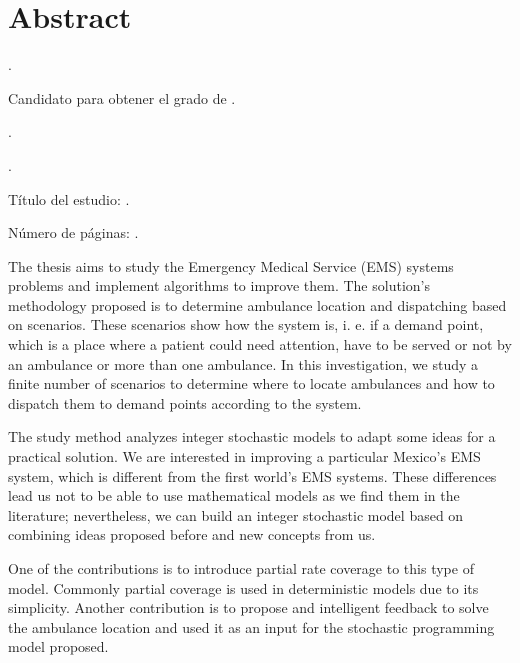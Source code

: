 
\chapter{Abstract}

{\setlength{\leftskip}{10mm}
\setlength{\parindent}{-10mm}

\autor.

Candidato para obtener el grado de \grado\orientacion.

\uanl.

\fime.

Título del estudio: \textsc{\titulo}.

\noindent Número de páginas: \pageref*{lastpage}.}




The thesis aims to study the Emergency Medical Service (EMS) systems pro\-blems and implement algorithms to improve them. The solution's methodology proposed is to determine ambulance location and dispatching based on scenarios. These scenarios show how the system is, i. e. if a demand point, which is a place where a patient could need attention, have to be served or not by an ambulance or more than one ambulance. In this investigation, we study a finite number of scenarios to determine where to locate ambulances and how to dispatch them to demand points according to the system.

The study method analyzes integer stochastic models to adapt some ideas for a practical solution. We are interested in improving a particular Mexico's EMS system, which is different from the first world's EMS systems. These differences lead us not to be able to use mathematical models as we find them in the literature; nevertheless, we can build an integer stochastic model based on combining ideas proposed before and new concepts from us. 

One of the contributions is to introduce partial rate coverage to this type of model. Commonly partial coverage is used in deterministic models due to its simplicity. Another contribution is to propose and intelligent feedback to solve the ambulance location and used it as an input for the stochastic programming model proposed. %

